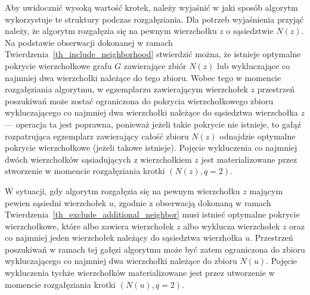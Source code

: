 \par{
  Aby uwidocznić wysoką wartość krotek, należy wyjaśnić w jaki sposób algorytm wykorzystuje te struktury podczas rozgałęziania.
  Dla potrzeb wyjaśnienia przyjąć należy, że algorytm rozgałęzia się na pewnym wierzchołku $z$ o sąsiedztwie $N(z)$.
  Na podstawie obserwacji dokonanej w ramach Twierdzenia~\ref{th_include_neighborhood} stwierdzić można, że istnieje optymalne pokrycie wierzchołkowe grafu $G$ zawierające zbiór $N(z)$ lub wykluczające co najmniej dwa wierzchołki należące do tego zbioru.
  Wobec tego w momencie rozgałęziania algorytmu, w egzemplarzu zawierającym wierzchołek $z$ przestrzeń poszukiwań może zostać ograniczona do pokrycia wierzchołkowego zbioru wykluczającego co najmniej dwa wierzchołki należące do sąsiedztwa wierzchołka $z$ --- operacja ta jest poprawna, ponieważ jeżeli takie pokrycie nie istnieje, to gałąź rozpatrująca egzemplarz zawierający całość zbioru $N(z)$ odnajdzie optymalne pokrycie wierzchołkowe (jeżeli takowe istnieje).
  Pojęcie wykluczenia co najmniej dwóch wierzchołków sąsiadujących z wierzchołkiem $z$ jest materializowane przez stworzenie w momencie rozgałęziania krotki $(N(z), q=2)$.

  W sytuacji, gdy algorytm rozgałęzia się na pewnym wierzchołku $z$ mającym pewien sąsiedni wierzchołek $u$, zgodnie z obserwacją dokonaną w ramach Twierdzenia~\ref{th_exclude_additional_neighbor} musi istnieć optymalne pokrycie wierzchołkowe, które albo zawiera wierzchołek $z$ albo wyklucza wierzchołek $z$ oraz co najmniej jeden wierzchołek należący do sąsiedztwa wierzhołka $u$.
  Przestrzeń poszukiwań w ramach tej gałęzi algorytmu może być zatem ograniczona do zbioru wykluczającego co najmniej dwa wierzchołki należące do zbioru $N(u)$.
  Pojęcie wykluczenia tychże wierzchołków materializowane jest przez utworzenie w momencie rozgałęziania krotki $(N(u), q=2)$.
}
